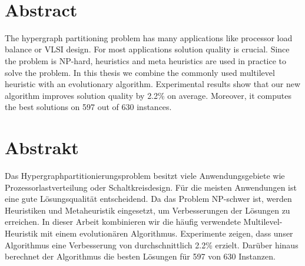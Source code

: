 \documentclass[a4paper,12pt,titlepage, BCOR7mm,headsepline]{scrbook}
\numberwithin{equation}{section}
\begin{document}

\ 
\newpage
\clearpage

\section*{Abstract}
The hypergraph partitioning problem has many applications like processor load balance or VLSI design.
For most applications solution quality is crucial. Since the problem is NP-hard, heuristics and meta heuristics are used in practice to solve the problem. In this thesis we combine the commonly used multilevel heuristic with an evolutionary algorithm. Experimental results show that our new algorithm improves solution quality by 2.2\% on average. Moreover, it computes the best solutions on 597 out of 630 instances.






\section*{Abstrakt}
Das Hypergraphpartitionierungsproblem besitzt viele Anwendungsgebiete wie Prozessorlastverteilung oder Schaltkreisdesign. Für die meisten Anwendungen ist eine gute Lösungsqualität entscheidend. Da das Problem NP-schwer ist, werden Heuristiken und Metaheuristik eingesetzt, um Verbesserungen der Lösungen zu erreichen.
In dieser Arbeit kombinieren wir die häufig verwendete Multilevel-Heuristik mit einem evolutionären Algorithmus. Experimente zeigen, dass unser Algorithmus eine Verbesserung von durchschnittlich 2.2\% erzielt. Darüber hinaus berechnet der Algorithmus die besten Lösungen für 597 von 630 Instanzen.
\end{document}
